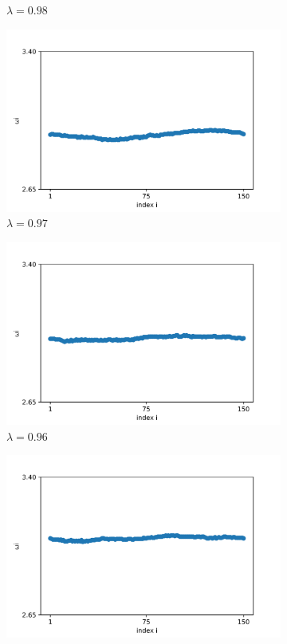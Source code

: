 \documentclass[a4paper,12pt]{article}
\begin{document}
\begin{figure}[H]
\begin{subfigure}{.32\textwidth}
  \caption{$\lambda=0.98$}
\end{subfigure}
\begin{subfigure}{.32\textwidth}
  \centering
  \includegraphics[width=1\linewidth]{w_lambda=0.97_t=2000.png}  
  \caption{$\lambda=0.97$}
\end{subfigure}
\hfill
\begin{subfigure}{.32\textwidth}
  \centering
  \includegraphics[width=1\linewidth]{w_lambda=0.96_t=2000.png}  
  \caption{$\lambda=0.96$}
\end{subfigure}
\hfill
\begin{subfigure}{.32\textwidth}
  \centering
  \includegraphics[width=1\linewidth]{w_lambda=0.95_t=2000.png}  

\end{subfigure}
\end{figure}
\end{document}

